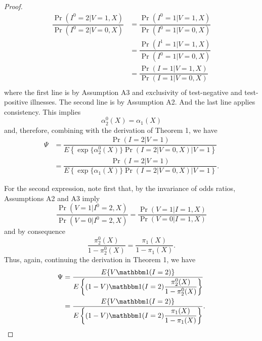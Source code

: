 \begin{appendix}
\begin{proof}
\begin{align*}
        \dfrac{\Pr(I^0 = 2 | V = 1, X)}{\Pr(I^0 = 2 | V = 0, X)} &= \dfrac{\Pr(I^0 = 1 | V = 1, X)}{\Pr(I^0 = 1 | V = 0, X)} \\
        &= \dfrac{\Pr(I^1 = 1 | V = 1, X)}{\Pr(I^0 = 1 | V = 0, X)} \\
        &= \dfrac{\Pr(I = 1 | V = 1, X)}{\Pr(I = 1 | V = 0, X)} \\
    \end{align*}
    where the first line is by Assumption A3 and exclusivity of test-negative and test-positive illnesses. The second line is by Assumption A2. And the last line applies consistency. This implies
    \begin{equation*}
        \alpha_2^0(X) = \alpha_1(X)
    \end{equation*}
    and, therefore, combining with the derivation of Theorem 1, we have
    \begin{align*}
        \Psi &= \dfrac{\Pr(I = 2 | V = 1)}{E\left\{ \exp\{\alpha^0_2(X)\} \Pr(I = 2 | V = 0, X) \Big| V = 1 \right\}} \\
        &= \dfrac{\Pr(I = 2 | V = 1)}{E\left\{ \exp\{\alpha_1(X)\} \Pr(I = 2 | V = 0, X) \Big| V = 1 \right\}}.
    \end{align*}
    
    For the second expression, note first that, by the invariance of odds ratios, Assumptions A2 and A3 imply
    \begin{equation*}
        \dfrac{\Pr(V = 1 | I^0 = 2, X)}{\Pr(V = 0 | I^0 = 2, X)} = \dfrac{\Pr(V = 1 | I = 1, X)}{\Pr(V = 0 | I = 1, X)}
    \end{equation*}
    and by consequence 
    \begin{equation*}
        \dfrac{\pi^0_2(X)}{1 - \pi^0_2(X)} = \dfrac{\pi_1(X)}{1 - \pi_1(X)}.
    \end{equation*}
    Thus, again, continuing the derivation in Theorem 1, we have 
    \begin{align*}
        \Psi &= \dfrac{E\{V \mathbbm 1 (I = 2)\}}{E\left\{(1 - V)\mathbbm 1 (I = 2) \dfrac{\pi^0_2(X)}{1-\pi^0_2(X)}\right\}} \\
        &= \dfrac{E\{V \mathbbm 1 (I = 2)\}}{E\left\{(1 - V)\mathbbm 1 (I = 2) \dfrac{\pi_1(X)}{1-\pi_1(X)}\right\}}.
    \end{align*}
    \end{proof}
    \newpage
    

\end{appendix}
